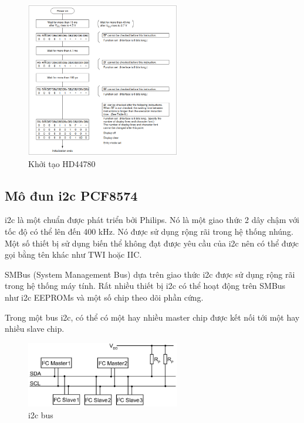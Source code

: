 \documentclass{report}
\begin{document}
\begin{figure}[H]
	\centering
	\includegraphics[width=0.6\textwidth]{../images/hd44780_init.png}
	\caption{Khởi tạo HD44780}
\end{figure}

\subsection{Mô đun \acrshort{i2c} PCF8574}

\acrshort{i2c} là một chuẩn được phát triển bởi Philips. Nó là một giao thức 2 dây chậm với tốc độ có thể lên đến 400 kHz. Nó được sử dụng rộng rãi trong hệ thống nhúng. Một số thiết bị sử dụng biến thể không đạt được yêu cầu của \acrshort{i2c} nên có thể được gọi bằng tên khác như TWI hoặc IIC.

SMBus (System Management Bus) dựa trên giao thức \acrshort{i2c} được sử dụng rộng rãi trong hệ thống máy tính. Rất nhiều thiết bị \acrshort{i2c} có thể hoạt động trên SMBus như \acrshort{i2c} EEPROMs và một số chip theo dõi phần cứng.

Trong một bus \acrshort{i2c}, có thể có một hay nhiều master chip được kết nối tới một hay nhiều slave chip.


\begin{figure}[H]
	\centering
	\includegraphics[width=0.6\textwidth]{../images/I2C-Bus-Layout.jpg}
	\caption{\acrshort{i2c} bus}
\end{figure}
\end{document}
